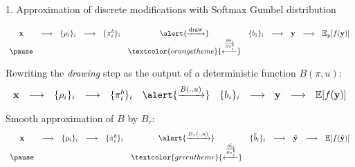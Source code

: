 \documentclass[10pt,aspectratio=169]{beamer}
\begin{document}
\begin{frame}{1. Approximation of discrete modifications with Softmax Gumbel distribution}
    
    \begin{equation*}
        \begin{array}{ccccccccccc}
            \mathbf{x}&  \longrightarrow & \{\rho_i\}_i & \longrightarrow  & \{\pi_i^b\}_i  &   \alert{\xrightarrow{\mbox{\footnotesize{draw}}}}  & \{b_i\}_i  &  \longrightarrow  & \mathbf{y}  & \longrightarrow  & \mathbb{E}_{y} [f(\mathbf{y})] \\ 
            \pause & & & & & \textcolor{orangetheme}{\xleftarrow{\frac{\partial b_i }{\partial \pi_i^b} }}
        \end{array}
    \end{equation*}
    
    \pause
    Rewriting the \textit{drawing} step as the output of a deterministic function $B(\pi, u)$:
    \begin{equation*}
        \begin{array}{ccccccccccc}
            \mathbf{x} & \longrightarrow & \{\rho_i\}_i & \longrightarrow  & \{\pi_i^b\}_i  &  \alert{\xrightarrow{B(., u)} } & \{b_i\}_i  &  \longrightarrow  & \mathbf{y} & \longrightarrow  & \mathbb{E}[f(\mathbf{y})]
        \end{array}
    \end{equation*}

    \pause
    Smooth approximation of $B$ by $B_\tau$: 
    \begin{equation*}
        \begin{array}{ccccccccccc}
            \mathbf{x} & \longrightarrow & \{\rho_i\}_i & \longrightarrow &  \{\pi_i^b\}_i  & \alert{\xrightarrow{B_\tau(.,u)} } & \{\tilde{b}_i\}_i  & \longrightarrow  & \tilde{\mathbf{y}} & \longrightarrow  & \mathbb{E}[f(\tilde{\mathbf{y}})] \\
            \pause & & & & & \textcolor{greentheme}{\xleftarrow{\frac{\partial \tilde{b}_i }{\partial \pi_i^b} }}
        \end{array}
    \end{equation*}

\end{frame}
\end{document}
